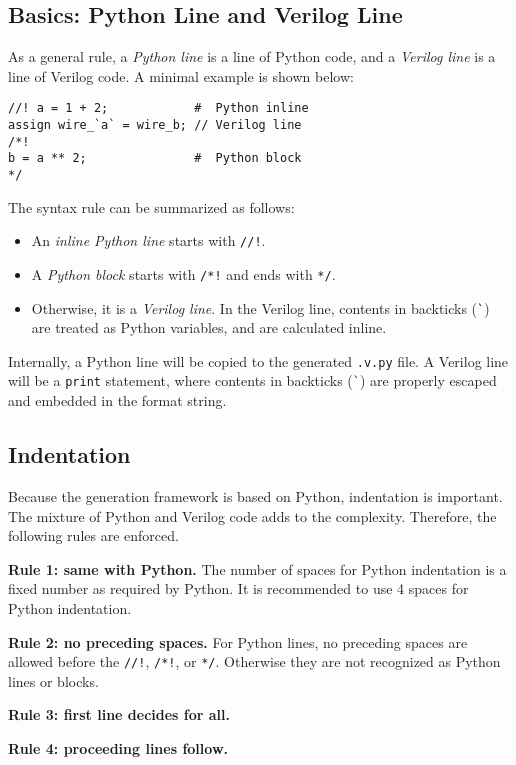 \subsection{Basics: Python Line and Verilog Line}
As a general rule, a \textit{Python line} is a line of Python code,
and a \textit{Verilog line} is a line of Verilog code.
A minimal example is shown below:

\begin{verbatim}
//! a = 1 + 2;            #  Python inline
assign wire_`a` = wire_b; // Verilog line
/*!
b = a ** 2;               #  Python block
*/
\end{verbatim}

The syntax rule can be summarized as follows:
\begin{itemize}
  \item An \textit{inline Python line} starts with \texttt{//!}.
  \item A \textit{Python block} starts with \texttt{/*!} and ends with \texttt{*/}.
  \item Otherwise, it is a \textit{Verilog line}.
  In the Verilog line, contents in backticks (\verb|`|) are treated as Python variables,
  and are calculated inline.
\end{itemize}

Internally, a Python line will be copied to the generated \texttt{.v.py} file.
A Verilog line will be a \texttt{print} statement,
where contents in backticks (\verb|`|) are properly escaped and embedded in the format string.

\subsection{Indentation}
Because the generation framework is based on Python,
indentation is important.
The mixture of Python and Verilog code adds to the complexity.
Therefore, the following rules are enforced.

\textbf{Rule 1: same with Python.}
The number of spaces for Python indentation is a fixed number as required by Python.
It is recommended to use 4 spaces for Python indentation.

\textbf{Rule 2: no preceding spaces.}
For Python lines, no preceding spaces are allowed before the \texttt{//!}, \texttt{/*!}, or \texttt{*/}.
Otherwise they are not recognized as Python lines or blocks.

\textbf{Rule 3: first line decides for all.}

\textbf{Rule 4: proceeding lines follow.}

